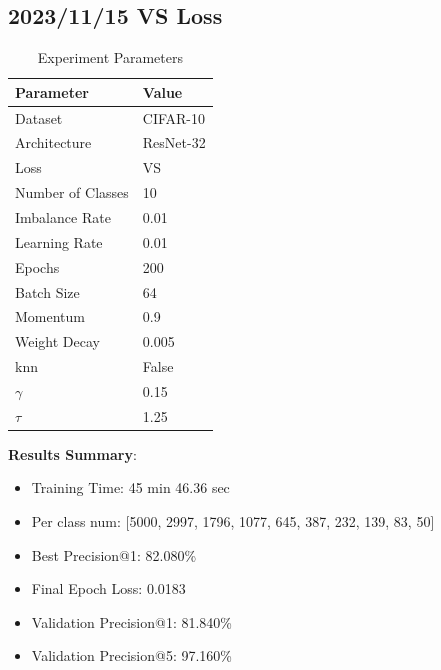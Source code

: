 \documentclass{article}
\begin{document}
\begin{multicols}{2} %
\section{2023/11/15 VS Loss}
\begin{table}[H]
\centering
\caption{Experiment Parameters}
\label{tab:parameters_vs}
\begin{tabular}{ll}
\toprule
Parameter & Value \\
\midrule
Dataset & CIFAR-10 \\
Architecture & ResNet-32 \\
Loss & VS \\
Number of Classes & 10 \\
Imbalance Rate & 0.01 \\
Learning Rate & 0.01 \\
Epochs & 200 \\
Batch Size & 64 \\
Momentum & 0.9 \\
Weight Decay & 0.005 \\
knn & False\\
\(\gamma\) & 0.15 \\
\(\tau\) & 1.25 \\
\bottomrule
\end{tabular}
\end{table}

\textbf{Results Summary}:
\begin{itemize}
    \item Training Time: 45 min 46.36 sec
    \item Per class num: [5000, 2997, 1796, 1077, 645, 387, 232, 139, 83, 50]
    \item Best Precision@1: 82.080\%
    \item Final Epoch Loss: 0.0183
    \item Validation Precision@1: 81.840\%
    \item Validation Precision@5: 97.160\%
\end{itemize}


\end{multicols}
\end{document}
